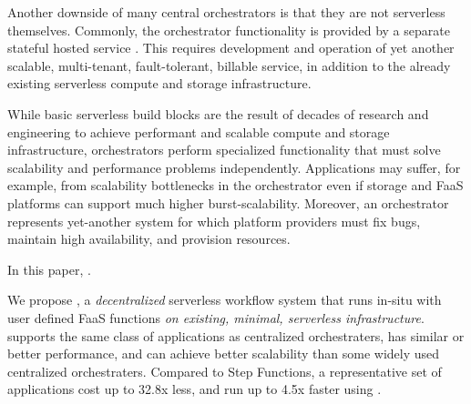 Another downside of many central orchestrators is that they are not serverless themselves.
Commonly, the orchestrator functionality is provided by a separate stateful hosted service
\cite{aws-step-functions, google-cloud-composer, google-workflows}. This requires
development and operation of yet another scalable, multi-tenant, fault-tolerant, 
billable service, in addition to the already existing serverless compute and storage 
infrastructure. 

While basic
serverless build blocks are the result of decades of research and engineering to
achieve performant and scalable compute and storage infrastructure,
orchestrators perform specialized functionality that must solve
scalability and performance problems independently. Applications may suffer, for
example, from scalability bottlenecks in the orchestrator even if storage and
FaaS platforms can support much higher burst-scalability. Moreover, an
orchestrator represents yet-another system for which platform providers must fix
bugs, maintain high availability, and provision resources.

In this paper, .

We propose \name{}, a \textit{decentralized} serverless workflow system
that runs in-situ with user defined FaaS functions \textit{on existing, minimal,
serverless infrastructure}. \name{} supports the same class of applications as
centralized orchestraters, has similar or better performance, and can achieve
better scalability than some widely used centralized orchestraters. Compared to
Step Functions, a representative set of applications cost up to 32.8x less, and
run up to 4.5x faster using \name{}.


